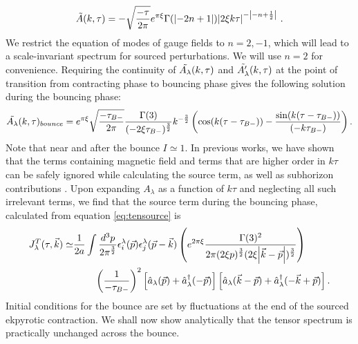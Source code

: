 \documentclass[12pt,a4paper]{article}
\numberwithin{equation}{section}
\numberwithin{equation}{section}
\begin{document}
\begin{equation}
\tilde{A}(k,\tau) = -\sqrt{\frac{-\tau}{2\pi}} e^{\pi \xi} \Gamma(\abs{-2n+1})\abs{ 2 \xi k \tau}^{-\abs{-n+\frac{1}{2}}} \ .\label{gaugefield}
\end{equation} 
We restrict the equation of modes of gauge fields to $n=2,-1$, which will lead to a scale-invariant spectrum for sourced perturbations. We will use $n=2$ for convenience. 
Requiring the continuity of $ \Tilde{A_{\lambda}}(k,\tau)$ and $ \Tilde{A'_{\lambda}}(k,\tau)$ at the point of transition from contracting phase to bouncing phase gives the following solution during the bouncing phase: 
\begin{equation}
     \Tilde{A_{\lambda}}(k,\tau)_{bounce} = e^{\pi \xi}  \sqrt{\frac{-\tau_{B-}}{2 \pi }} \frac{\Gamma(3)}{(-2 \xi \tau_{B-})^{\frac{3}{2}}} k^{-\frac{3}{2}} %
     \left(\cos(k(\tau-\tau_{B-}))- \frac{ \sin(k(\tau-\tau_{B-}))}{(-k \tau_{B-}) } \right) .
     \label{gauge b}
\end{equation}
Note that near and after the bounce $I\simeq1$.
In previous works, we have shown that the terms containing magnetic field  and terms that are higher order in $k\tau$ can be safely ignored while calculating the source term, as well as subhorizon contributions \cite{r1,r3,Artymowski:2020pci}. Upon expanding $A_{\lambda}$ as a function of $k\tau$ and neglecting all such irrelevant terms, we find that the source term during the bouncing phase, calculated from equation \eqref{eq:tensource} is
\begin{equation}
\begin{split}
    J_{\lambda}^T (\tau,\Vec{k})\simeq & \frac{1}{2 a}\int \frac{d^3p}{2\pi^\frac{3}{2}} 
\epsilon_i^{\lambda}(\vec{p})\epsilon_j^{\lambda}(\vec{p}-\vec{k}) \left( e^{2\pi \xi} \frac{ \Gamma(3)^2}{2\pi  (2 \xi p)^{\frac{3}{2}}(2 \xi \abs{\vec{k}-\vec{p}})^{\frac{3}{2}} } \right) \\
&\;\;\;\;\;\;\;\; \left(\frac{1}{-\tau_{B-}} \right)^2 \left[ \hat{a}_{\lambda}(\vec{p})+\hat{a}^{\dagger}_{\lambda}(-\vec{p})\right]\left[ \hat{a}_{\lambda}(\vec{k}-\vec{p})+\hat{a}^{\dagger}_{\lambda}(-\vec{k}+\vec{p})\right].\end{split}
\label{sourceb}
\end{equation}
Initial conditions for the bounce are set by fluctuations at the end of the sourced ekpyrotic contraction. We shall now show analytically that the tensor spectrum is practically unchanged across the bounce.
\end{document}
